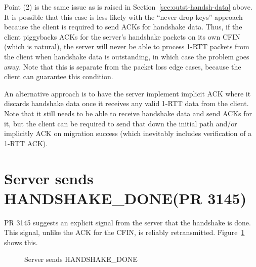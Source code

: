 \documentclass{article}
\begin{document}
Point (2) is the same issue as is raised in
Section~\ref{sec:outst-handsh-data} above. It is possible that this
case is less likely with the ``never drop keys'' approach because
the client is required to send ACKs for handshake data. Thus, if
the client piggybacks ACKs for the server's handshake packets
on its own CFIN (which is natural), the server will never be
able to process 1-RTT packets from the client when handshake
data is outstanding, in which case the problem goes away. Note
that this is separate from the packet loss edge cases, because
the client can guarantee this condition.

An alternative approach is to have the server implement
implicit ACK where it discards handshake data once it receives
any valid 1-RTT data from the client. Note that it still needs to
be able to receive handshake data and send ACKs for it, but
the client can be required to send that down the initial
path and/or implicitly ACK on migration success (which inevitably
includes verification of a 1-RTT ACK).

\section{Server sends HANDSHAKE_DONE(PR 3145)
}
\label{sec:serv-sends-handsh}

PR 3145 suggests an explicit signal from the server that the handshake
is done. This signal, unlike the ACK for the CFIN, is reliably
retransmitted. Figure~\ref{fig:server-hd} shows this.


\begin{figure}[H]
\begin{center}
\end{center}
\caption{Server sends HANDSHAKE\_DONE}
\label{fig:server-hd}
\end{figure}
\end{document}
